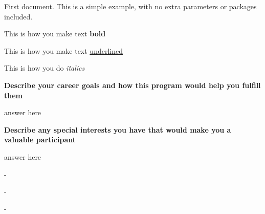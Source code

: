 \documentclass{article}
\begin{document}
First document. This is a simple example, with no 
extra parameters or packages included.

This is how you make text \textbf{bold}

This is how you make text \underline{underlined} 

This is how you do \textit{italics}

\textbf{Describe your career goals and how this program would help you fulfill them}

answer here

\textbf{Describe any special interests you have that would make you a valuable participant}

answer here




    - 

    - 

    - 

\end{document}
